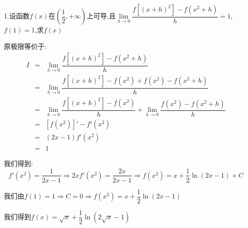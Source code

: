 1.设函数$f(x)$在$(\dfrac{1}{2},+\infty)$上可导,且$\lim\limits_{h\rightarrow 0}\dfrac{f[(x+h)^2]-f(x^2+h)}{h}=1$,$f(1)=1$,求$f(x)$
\begin{solution}

	原极限等价于:  
	\begin{eqnarray*}
		I&=&\lim\limits_{h\rightarrow 0}\dfrac{f[(x+h)^2]-f(x^2+h)}{h}\\
		&=&\lim\limits_{h\rightarrow 0}\dfrac{f[(x+h)^2]-f(x^2)+f(x^2)-f(x^2+h)}{h}\\
		&=&\lim\limits_{h\rightarrow 0}\dfrac{f[(x+h)^2]-f(x^2)}{h}+\lim\limits_{h\rightarrow 0}\dfrac{f(x^2)-f(x^2+h)}{h}\\
		&=&[f(x^2)]'-f'(x^2)\\
		&=&(2x-1)f'(x^2)\\
		&=&1
	\end{eqnarray*}

	我们得到:  
	$$f'(x^2)=\dfrac{1}{2x-1}\Rightarrow 2xf'(x^2)=\dfrac{2x}{2x-1}\Rightarrow f(x^2)=x+\dfrac{1}{2}\ln(2x-1)+C$$
	
	我们由$f(1)=1\Rightarrow C=0\Rightarrow f(x^2)=x+\dfrac{1}{2}\ln(2x-1)$
	
	我们得到$f(x)=\sqrt{x}+\dfrac{1}{2}\ln(2\sqrt{x}-1)$
\end{solution}

